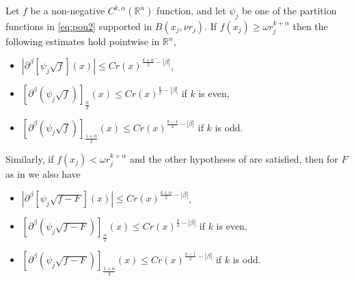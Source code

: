 \documentclass[oneside,hidelinks,indentfirst,10pt]{book}
\begin{document}
\begin{lem}\label{lem:rootscors}
Let \(f\) be a non-negative \(C^{k,\alpha}(\mathbb{R}^n)\) function, and let \(\psi_j\) be one of the partition functions in \eqref{eq:pou2} supported in \(B(x_j,\nu r_j)\). If \(f(x_j)\geq \omega r_j^{k+\alpha}\) then the following estimates hold pointwise in \(\mathbb{R}^n\),
\begin{itemize}
    \item[(1)] \(|\partial^\beta[\psi_j\sqrt{f}](x)|\leq Cr(x)^{\frac{k+\alpha}{2}-|\beta|}\),
    \item[(2)] \([\partial^\beta(\psi_j\sqrt{f})]_{\frac{\alpha}{2}}(x)\leq Cr(x)^{\frac{k}{2}-|\beta|}\) if \(k\) is even,
    \item[(3)] \([\partial^\beta(\psi_j\sqrt{f})]_{\frac{1+\alpha}{2}}(x)\leq Cr(x)^{\frac{k-1}{2}-|\beta|}\) if \(k\) is odd.
\end{itemize}
Similarly, if \(f(x_j)<\omega r_j^{k+\alpha}\) and the other hypotheses of  are satisfied, then for \(F\) as in  we also have
\begin{itemize}
    \item[(4)] \(|\partial^\beta[\psi_j\sqrt{f-F}](x)|\leq Cr(x)^{\frac{k+\alpha}{2}-|\beta|}\),
    \item[(5)] \([\partial^\beta(\psi_j\sqrt{f-F})]_{\frac{\alpha}{2}}(x)\leq Cr(x)^{\frac{k}{2}-|\beta|}\) if \(k\) is even,
    \item[(6)] \([\partial^\beta(\psi_j\sqrt{f-F})]_{\frac{1+\alpha}{2}}(x)\leq Cr(x)^{\frac{k-1}{2}-|\beta|}\) if \(k\) is odd.
\end{itemize}
\end{lem}
\end{document}
